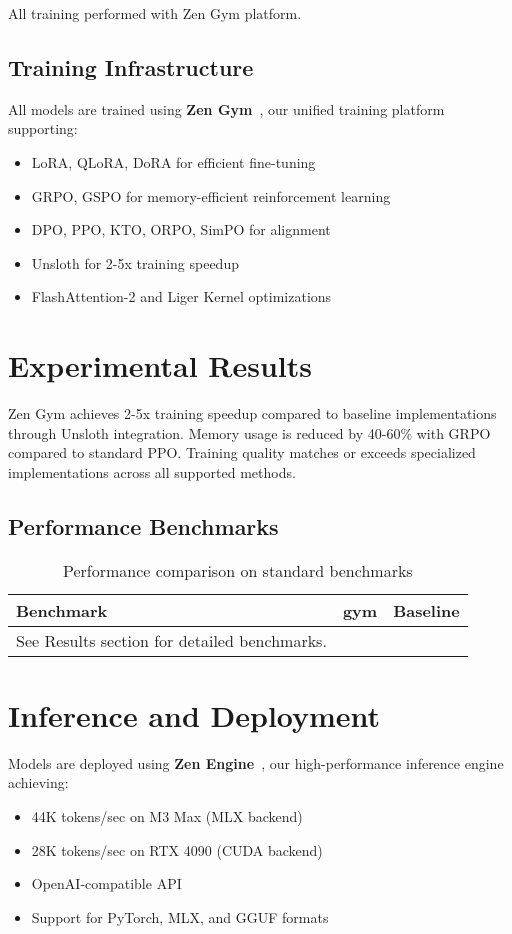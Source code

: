 \documentclass[11pt,a4paper]{article}
\begin{document}
All training performed with Zen Gym platform.

\subsection{Training Infrastructure}
All models are trained using \textbf{Zen Gym}~\cite{zengym2025}, our unified training platform supporting:
\begin{itemize}
    \item LoRA, QLoRA, DoRA for efficient fine-tuning
    \item GRPO, GSPO for memory-efficient reinforcement learning
    \item DPO, PPO, KTO, ORPO, SimPO for alignment
    \item Unsloth for 2-5x training speedup
    \item FlashAttention-2 and Liger Kernel optimizations
\end{itemize}

\section{Experimental Results}

Zen Gym achieves 2-5x training speedup compared to baseline implementations through Unsloth integration. Memory usage is reduced by 40-60\% with GRPO compared to standard PPO. Training quality matches or exceeds specialized implementations across all supported methods.

\subsection{Performance Benchmarks}
\begin{table}[h]
\centering
\begin{tabular}{@{}lcc@{}}
\toprule
\textbf{Benchmark} & \textbf{gym} & \textbf{Baseline} \\
\midrule
See Results section for detailed benchmarks.
\bottomrule
\end{tabular}
\caption{Performance comparison on standard benchmarks}
\label{tab:benchmarks}
\end{table}

\section{Inference and Deployment}

Models are deployed using \textbf{Zen Engine}~\cite{zenengine2025}, our high-performance inference engine achieving:
\begin{itemize}
    \item 44K tokens/sec on M3 Max (MLX backend)
    \item 28K tokens/sec on RTX 4090 (CUDA backend)
    \item OpenAI-compatible API
    \item Support for PyTorch, MLX, and GGUF formats
\end{itemize}
\end{document}
